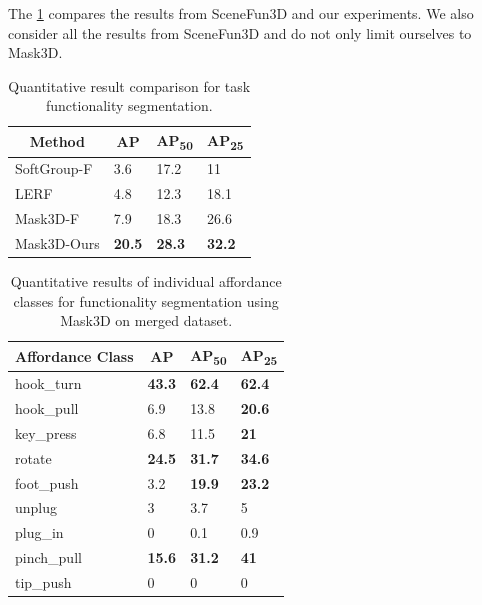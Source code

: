 The \cref{tab:quantitativeResults} compares the results from SceneFun3D and our experiments. We also consider all the results from SceneFun3D and do not only limit ourselves to
Mask3D. 

\begin{longtable}{l|l|l|l}
    \caption{Quantitative result comparison for task functionality segmentation.} \label{tab:quantitativeResults} \\
    \hline \multicolumn{1}{|c|}{\textbf{Method}} & \multicolumn{1}{c|}{\textbf{AP}} & \multicolumn{1}{c|}{\textbf{AP\textsubscript{50}}} & \multicolumn{1}{c|}{\textbf{AP\textsubscript{25}}} \\ \hline
    SoftGroup-F & 3.6 & 17.2 & 11 \\
    LERF & 4.8 & 12.3 & 18.1\\
    Mask3D-F & 7.9 & 18.3 & 26.6\\
    Mask3D-Ours & \textbf{20.5} & \textbf{28.3} & \textbf{32.2}\\
    \hline
\end{longtable}
\begin{longtable}{l|l|l|l}
    \caption{Quantitative results of individual affordance classes for functionality segmentation using Mask3D on merged dataset.} \label{tab:quantitativeResultsIndividual} \\
    \hline \multicolumn{1}{|c|}{\textbf{Affordance Class}} & \multicolumn{1}{c|}{\textbf{AP}} & \multicolumn{1}{c|}{\textbf{AP\textsubscript{50}}} & \multicolumn{1}{c|}{\textbf{AP\textsubscript{25}}} \\ \hline
    hook\_turn & \textbf{43.3} & \textbf{62.4} & \textbf{62.4} \\
    hook\_pull & 6.9 & 13.8 & \textbf{20.6}\\
    key\_press & 6.8 & 11.5 & \textbf{21}\\
    rotate & \textbf{24.5} & \textbf{31.7} & \textbf{34.6}\\
    foot\_push & 3.2 & \textbf{19.9} & \textbf{23.2}\\
    unplug & 3 & 3.7 & 5\\
    plug\_in & 0 & 0.1 & 0.9\\
    pinch\_pull & \textbf{15.6} & \textbf{31.2} & \textbf{41}\\
    tip\_push & 0 & 0 & 0\\
    \hline
\end{longtable}
